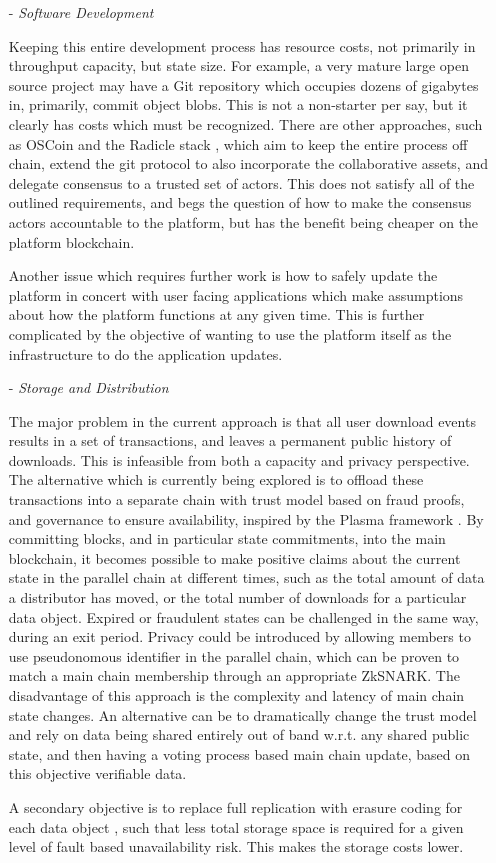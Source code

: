 \documentclass{article}
\begin{document}
\begin{itemize}
    \item[-] \textit{Software Development}

    Keeping this entire development process has resource costs, not primarily in throughput capacity, but state size. For example, a very mature large open source project may have a Git repository which occupies dozens of gigabytes in, primarily, commit object blobs. This is not a non-starter per say, but it clearly has costs which must be recognized. There are other approaches, such as OSCoin and the Radicle stack \cite{oscoin},  which aim to keep the entire process off chain, extend the git protocol to also incorporate the collaborative assets, and delegate consensus to a trusted set of actors. This does not satisfy all of the outlined requirements, and begs the question of how to make the consensus actors accountable to the platform, but has the benefit being cheaper on the platform blockchain.

    Another issue which requires further work is how to safely update the platform in concert with user facing applications which make assumptions about how the platform functions at any given time. This is further complicated by the objective of wanting to use the platform itself as the infrastructure to do the application updates.

    \item[-] \textit{Storage and Distribution}

    The major problem in the current approach is that all user download events results in a set of transactions, and leaves a permanent public history of downloads. This is infeasible from both a capacity and privacy perspective. The alternative which is currently being explored is to offload these transactions into a separate chain with trust model based on fraud proofs, and governance to ensure availability, inspired by the Plasma framework \cite{poon2017plasma}. By committing blocks, and in particular state commitments, into the main blockchain, it becomes possible to make positive claims about the current state in the parallel chain at different times, such as the total amount of data a distributor has moved, or the total number of downloads for a particular data object. Expired or fraudulent states can be challenged in the same way, during an exit period. Privacy could be introduced by allowing members to use pseudonomous identifier in the parallel chain, which can be proven to match a main chain membership through an appropriate ZkSNARK. The disadvantage of this approach is the complexity and latency of main chain state changes. An alternative can be to dramatically change the trust model and rely on data being shared entirely out of band w.r.t. any shared public state, and then having a voting process based main chain update, based on this objective verifiable data.

    A secondary objective is to replace full replication with erasure coding for each data object \cite{reed1960polynomial}, such that less total storage space is required for a given level of fault based unavailability risk. This makes the storage costs lower.

\end{itemize}



\end{document}
